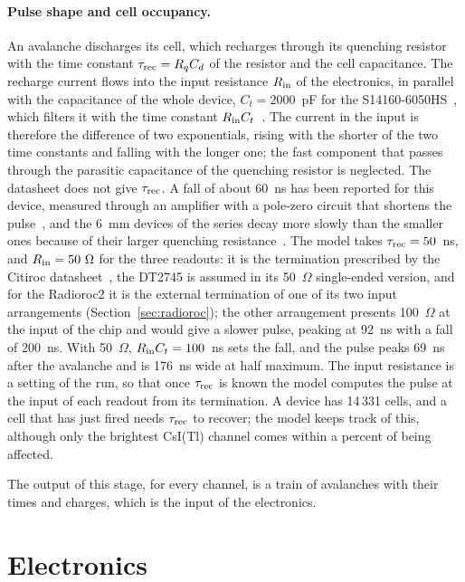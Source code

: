 \documentclass[11pt]{article}
\newcommand{\csitl}{CsI(Tl)\xspace}
\begin{document}
\paragraph{Pulse shape and cell occupancy.} An avalanche discharges its
cell, which recharges through its quenching resistor with the time constant
$\tau_{\rm rec} = R_q C_d$ of the resistor and the cell capacitance. The
recharge current flows into the input resistance $R_{\rm in}$ of the
electronics, in parallel with the capacitance of the whole device,
$C_t = 2000$~pF for the S14160-6050HS~\cite{hpk}, which filters it with the
time constant $R_{\rm in} C_t$~\cite{seifert}. The current in the input is
therefore the difference of two exponentials, rising with the shorter of the
two time constants and falling with the longer one; the fast component that
passes through the parasitic capacitance of the quenching resistor is
neglected. The datasheet does not give $\tau_{\rm rec}$. A fall of about
60~ns has been reported for this device, measured through an amplifier with
a pole-zero circuit that shortens the pulse~\cite{kampert}, and the 6~mm
devices of the series decay more slowly than the smaller ones because of
their larger quenching resistance~\cite{cattaneo}. The model takes
$\tau_{\rm rec} = 50$~ns, and $R_{\rm in} = 50~\Omega$ for the three
readouts: it is the termination prescribed by the Citiroc
datasheet~\cite{citiroc}, the DT2745 is assumed in its 50~$\Omega$
single-ended version, and for the Radioroc2 it is the external termination
of one of its two input arrangements (Section~\ref{sec:radioroc}); the other
arrangement presents 100~$\Omega$ at the input of the chip and would give a
slower pulse, peaking at 92~ns with a fall of 200~ns. With 50~$\Omega$,
$R_{\rm in} C_t = 100$~ns sets the
fall, and the pulse peaks 69~ns after the avalanche and is 176~ns wide at
half maximum. The input resistance is a setting of the run, so that once
$\tau_{\rm rec}$ is known the model computes the pulse at the input of each
readout from its termination. A device has 14\,331
cells, and a cell that has just fired needs $\tau_{\rm rec}$ to recover; the
model keeps track of this, although only the brightest \csitl channel comes
within a percent of being affected.

The output of this stage, for every channel, is a train of avalanches with
their times and charges, which is the input of the electronics.

\section{Electronics}
\label{sec:electronics}
\end{document}
